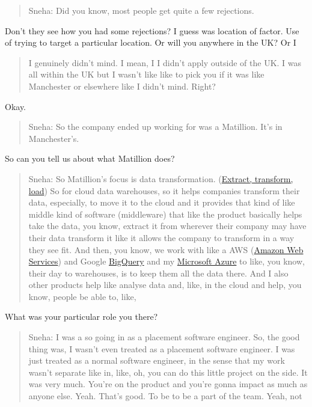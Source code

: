 \documentclass[
]{book}
\begin{document}
\begin{quote}
Sneha: Did you know, most people get quite a few rejections.
\end{quote}

Don't they see how you had some rejections? I guess was location of factor. Use of trying to target a particular location. Or will you anywhere in the UK? Or I

\begin{quote}
I genuinely didn't mind. I mean, I I didn't apply outside of the UK. I was all within the UK but I wasn't like like to pick you if it was like Manchester or elsewhere like I didn't mind. Right?
\end{quote}

Okay.

\begin{quote}
Sneha: So the company ended up working for was a Matillion. It's in Manchester's.
\end{quote}

So can you tell us about what Matillion does?

\begin{quote}
Sneha: So Matillion's focus is data transformation. (\href{https://en.wikipedia.org/wiki/Extract,_transform,_load}{Extract, transform, load}) So for cloud data warehouses, so it helps companies transform their data, especially, to move it to the cloud and it provides that kind of like middle kind of software (middleware) that like the product basically helps take the data, you know, extract it from wherever their company may have their data transform it like it allows the company to transform in a way they see fit. And then, you know, we work with like a AWS (\href{https://en.wikipedia.org/wiki/Amazon_Web_Services}{Amazon Web Services}) and Google \href{https://en.wikipedia.org/wiki/BigQuery}{BigQuery} and my \href{https://en.wikipedia.org/wiki/Microsoft_Azure}{Microsoft Azure} to like, you know, their day to warehouses, is to keep them all the data there. And I also other products help like analyse data and, like, in the cloud and help, you know, people be able to, like,
\end{quote}

What was your particular role you there?

\begin{quote}
Sneha: I was a so going in as a placement software engineer. So, the good thing was, I wasn't even treated as a placement software engineer. I was just treated as a normal software engineer, in the sense that my work wasn't separate like in, like, oh, you can do this little project on the side. It was very much. You're on the product and you're gonna impact as much as anyone else. Yeah. That's good. To be to be a part of the team. Yeah, not
\end{quote}
\end{document}
